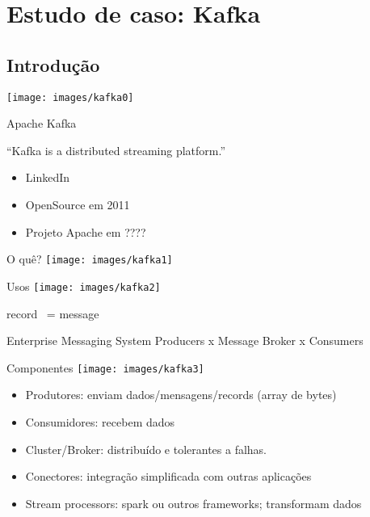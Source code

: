 \section{Estudo de caso: Kafka}

\subsection{Introdução}



\begin{frame}
\texttt{[image: images/kafka0]}
\end{frame}

\begin{frame}{Apache Kafka}

``Kafka is a distributed streaming platform.''

\begin{itemize}
	\item LinkedIn
	\item OpenSource em 2011
	\item Projeto Apache em ????
\end{itemize}
\end{frame}


\begin{frame}{O quê?}
\texttt{[image: images/kafka1]}
\end{frame}

\begin{frame}{Usos}
\texttt{[image: images/kafka2]}

\pause record ~= message

\pause
\begin{block}{Enterprise Messaging System}
	Producers x Message Broker x Consumers
\end{block}
\end{frame}

\begin{frame}{Componentes}
\texttt{[image: images/kafka3]}

\begin{itemize}
	\item Produtores: enviam dados/mensagens/records (array de bytes)
	\item Consumidores: recebem dados
	\item Cluster/Broker: distribuído e tolerantes a falhas.
	\item Conectores: integração simplificada com outras aplicações 
	\item Stream processors: spark ou outros frameworks; transformam dados
\end{itemize}
\end{frame}


